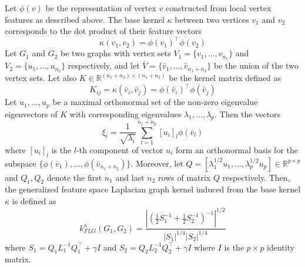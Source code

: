 \documentclass[twoside,11pt]{article}
\begin{document}
Let $\phi(v)$ be the representation of vertex $v$ constructed from local vertex features as described above.
The base kernel $\kappa$ between two vertices $v_1$ and $v_2$ corresponds to the dot product of their feature vectors
\begin{equation}
    \kappa(v_1, v_2) = \phi(v_1)^\top \phi(v_2) 
\end{equation}
Let $G_1$ and $G_2$ be two graphs with vertex sets $V_1 = \{ v_1, \ldots, v_{n_1}\}$ and $V_2 = \{ u_1, \ldots, u_{n_2} \}$ respectively, and let $\bar{V} = \{ \bar{v}_1, \ldots, \bar{v}_{n_1+n_2} \}$ be the union of the two vertex sets.
Let also $K \in \mathbb{R}^{(n_1+n_2) \times (n_1+n_2)}$ be the kernel matrix defined as
\begin{equation}
    K_{ij} = \kappa(\bar{v}_i, \bar{v}_j) = \phi(\bar{v}_i)^\top \phi(\bar{v}_j)
\end{equation}
Let $u_1, \ldots, u_p$ be a maximal orthonormal set of the non-zero eigenvalue eigenvectors of $K$
with corresponding eigenvalues $\lambda_1, \ldots, \lambda_p$.
Then the vectors
\begin{equation}
    \xi_i = \frac{1}{\sqrt{\lambda_i}} \sum_{l=1}^{n_1+n_2} [u_i]_l \phi(\bar{v}_l)
\end{equation}
where $[u_i]_l$ is the $l$-th component of vector $u_i$ form an orthonormal basis for the subspace $\{ \phi(\bar{v}_1), \ldots, \phi(\bar{v}_{n_1+n_2}) \}$.
Moreover, let $Q = [ \lambda_1^{1/2} u_1, \ldots,\lambda_p^{1/2} u_p ] \in \mathbb{R}^{p \times p}$ and $Q_1, Q_2$ denote the first $n_1$ and last $n_2 $ rows of matrix $Q$ respectively.
Then, the generalized feature space Laplacian graph kernel induced from the base kernel $\kappa$ is defined as
\begin{equation}
    k_{FLG}^\kappa(G_1, G_2) = \frac{| (\frac{1}{2} S_1^{-1} + \frac{1}{2} S_2^{-1} )^{-1} |^{1/2}}{|S_1|^{1/4} |S_2|^{1/4}} 
\end{equation}
where $S_1 = Q_1 L_1^{-1} Q_1^\top + \gamma I$ and $S_2 = Q_2 L_2^{-1} Q_2^\top + \gamma I$ where $I$ is the $p \times p$ identity matrix.
\end{document}
